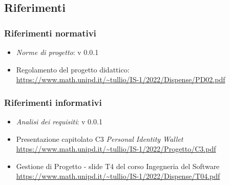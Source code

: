 \subsection{Riferimenti}

\subsubsection{Riferimenti normativi}
\begin{itemize}
    \item \textit{Norme di progetto}: v 0.0.1
    \item Regolamento del progetto didattico: \\
    \url{https://www.math.unipd.it/~tullio/IS-1/2022/Dispense/PD02.pdf}
\end{itemize}

\subsubsection{Riferimenti informativi}
\begin{itemize}
    \item \textit{Analisi dei requisiti}: v 0.0.1
    \item Presentazione capitolato C3 \textit{Personal Identity Wallet} \\ \url{https://www.math.unipd.it/~tullio/IS-1/2022/Progetto/C3.pdf}
    \item Gestione di Progetto - slide T4 del corso Ingegneria del Software \\ \url{https://www.math.unipd.it/~tullio/IS-1/2022/Dispense/T04.pdf}
\end{itemize}




